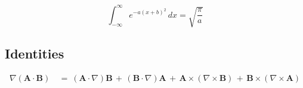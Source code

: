 \documentclass[a4paper, twocolumn]{article}
\begin{document}
\begin{equation}
    \int_{-\infty}^{\infty}  e^{-a(x+b)^2}\,dx= \sqrt{\frac{\pi}{a}}
\end{equation}

\subsection{Identities}

\begin{align*}
  \nabla(\mathbf{A} \cdot \mathbf{B}) &\ =\  (\mathbf{A} \cdot \nabla)\mathbf{B} \,+\,  (\mathbf{B} \cdot \nabla)\mathbf{A} \,+\,  \mathbf{A} {\times} (\nabla {\times} \mathbf{B}) \,+\,  \mathbf{B} {\times} (\nabla {\times} \mathbf{A})
\end{align*}
\end{document}
